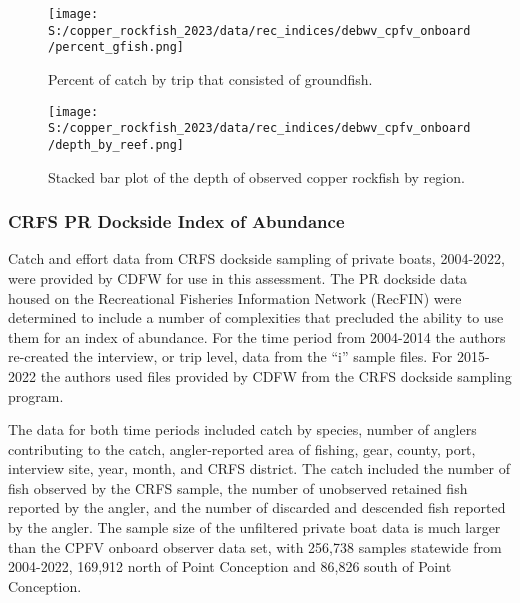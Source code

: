 \documentclass[11pt,
  letterpaper,
]{article}
\begin{document}
\begin{figure}
{\centering
\texttt{[image: S:/copper\_rockfish\_2023/data/rec\_indices/debwv\_cpfv\_onboard/percent\_gfish.png]}
}
\caption{Percent of catch by trip that consisted of groundfish.\label{fig:deb-percent-gfish}}
\end{figure}

\begin{figure}
{\centering
\texttt{[image: S:/copper\_rockfish\_2023/data/rec\_indices/debwv\_cpfv\_onboard/depth\_by\_reef.png]}
}
\caption{Stacked bar plot of the depth of observed copper rockfish by region.\label{fig:deb-depths}}
\end{figure}

\subsubsection{CRFS PR Dockside Index of Abundance}\label{crfs-pr-index}

Catch and effort data from CRFS dockside sampling of private boats, 2004-2022, were provided by CDFW for use in this assessment. The PR dockside data housed on the Recreational Fisheries Information Network (RecFIN) were determined to include a number of complexities that precluded the ability to use them for an index of abundance. For the time period from 2004-2014 the authors re-created the interview, or trip level, data from the ``i'' sample files. For 2015-2022 the authors used files provided by CDFW from the CRFS dockside sampling program.

The data for both time periods included catch by species, number of anglers contributing to the catch, angler-reported area of fishing, gear, county, port, interview site, year, month, and CRFS district. The catch included the number of fish observed by the CRFS sample, the number of unobserved retained fish reported by the angler, and the number of discarded and descended fish reported by the angler. The sample size of the unfiltered private boat data is much larger than the CPFV onboard observer data set, with 256,738 samples statewide from 2004-2022, 169,912 north of Point Conception and 86,826 south of Point Conception.
\end{document}
